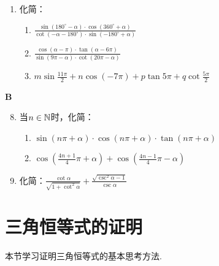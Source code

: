 \begin{enumerate}
\item 化简： 
\begin{enumerate}[(1)]
\item $\frac{\sin(180^{\circ}-\alpha)\cdot \cos(360^{\circ}+\alpha)}{\cot(-\alpha-180^{\circ})\cdot \sin (-180^{\circ}+\alpha)}$
\item $\frac{\cos(\alpha-\pi)\cdot \tan(\alpha-6\pi)}{\sin(9\pi-\alpha)\cdot \cot(20\pi-\alpha)}$
\item $m\sin\frac{11\pi}{2}+n\cos (-7\pi)+p\tan 5\pi+q\cot\frac{5\pi}{2}$
\end{enumerate}

\end{enumerate}



\begin{center}
    \bfseries B
\end{center}

\begin{enumerate}\setcounter{enumi}{7}
    \item 当$n\in\mathbb{N}$时，化简：
\begin{enumerate}[(1)]
    \item $\sin(n\pi+\alpha)\cdot \cos(n\pi+\alpha)\cdot \tan(n\pi+\alpha)$
    \item $\cos\left(\frac{4n+1}{4}\pi+\alpha\right)+\cos\left(\frac{4n-1}{4}\pi-\alpha\right)$
\end{enumerate}
\item 化简：$\frac{\cot\alpha}{\sqrt{1+\cot^2\alpha}}+\frac{\sqrt{\csc^2\alpha-1}}{\csc\alpha}$
\end{enumerate}

\section{三角恒等式的证明}
本节学习证明三角恒等式的基本思考方法.

